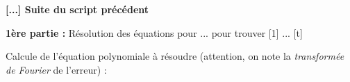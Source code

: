 \begin{maplegroup}
\begin{center}
\textbf{[...] Suite du script précédent}
\end{center}

\end{maplegroup}
\begin{maplegroup}
\begin{flushleft}
\textbf{{\large 1ère partie : }}Résolution des équations pour 
 ... 
 pour trouver 
[1] ... 
[t]
\end{flushleft}

\end{maplegroup}
\begin{maplegroup}
\begin{flushleft}
Calcule de l'équation polynomiale à résoudre (attention, on note la 
 \textit{transformée de Fourier} de l'erreur) :
\end{flushleft}

\end{maplegroup}

